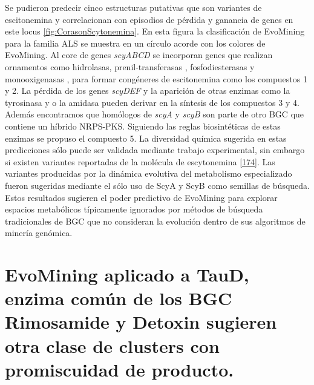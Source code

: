\documentclass[12pt,twoside]{reedthesis}
\begin{document}
  Se pudieron predecir cinco estructuras putativas que son variantes de
  escitonemina y correlacionan con episodios de pérdida y ganancia de
  genes en este locus \autoref{fig:CorasonScytonemina}. En esta figura la
  clasificación de EvoMining para la familia ALS se muestra en un círculo
  acorde con los colores de EvoMining. Al core de genes \emph{scyABCD} se
  incorporan genes que realizan ornamentos como hidrolasas,
  prenil-transferasas , fosfodiesterasas y monooxigenasas , para formar
  congéneres de escitonemina como los compuestos 1 y 2. La pérdida de los
  genes \emph{scyDEF} y la aparición de otras enzimas como la tyrosinasa y
  o la amidasa pueden derivar en la síntesis de los compuestos 3 y 4.
  Además encontramos que homólogos de \emph{scyA} y \emph{scyB} son parte
  de otro BGC que contiene un híbrido NRPS-PKS. Siguiendo las reglas
  biosintéticas de estas enzimas se propuso el compuesto 5. La diversidad
  química sugerida en estas predicciones sólo puede ser validada mediante
  trabajo experimental, sin embargo si existen variantes reportadas de la
  molécula de escytonemina
  {[}\protect\hyperlink{ref-grant_scytonemin-imine_2013}{174}{]}. Las
  variantes producidas por la dinámica evolutiva del metabolismo
  especializado fueron sugeridas mediante el sólo uso de ScyA y ScyB como
  semillas de búsqueda. Estos resultados sugieren el poder predictivo de
  EvoMining para explorar espacios metabólicos típicamente ignorados por
  métodos de búsqueda tradicionales de BGC que no consideran la evolución
  dentro de sus algoritmos de minería genómica.
  
  \section{EvoMining aplicado a TauD, enzima común de los BGC Rimosamide y
  Detoxin sugieren otra clase de clusters con promiscuidad de
  producto.}\label{evomining-aplicado-a-taud-enzima-comun-de-los-bgc-rimosamide-y-detoxin-sugieren-otra-clase-de-clusters-con-promiscuidad-de-producto.}
  
\end{document}
